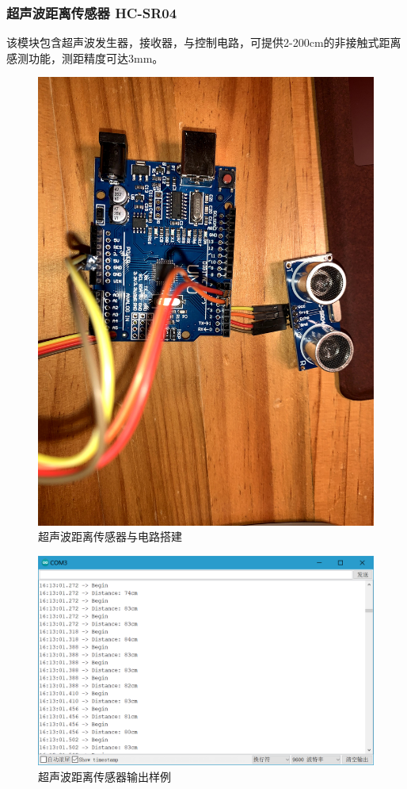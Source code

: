 \documentclass[conference]{IEEEtran}
\theoremstyle{break}
\begin{document}
\subsubsection{超声波距离传感器 HC-SR04}
该模块包含超声波发生器，接收器，与控制电路，可提供2-200cm的非接触式距离感测功能，测距精度可达3mm。
\begin{figure}[htbp]
        \centerline{\includegraphics[scale=0.05]{超声波传感器.JPG}}
        \caption{超声波距离传感器与电路搭建}
        \label{fig}
        \end{figure}
        \begin{figure}[htbp]
                \centerline{\includegraphics[scale=0.17]{距离传感器输出样例.png}}
                \caption{超声波距离传感器输出样例}
                \label{fig}
                \end{figure}
\end{document}
